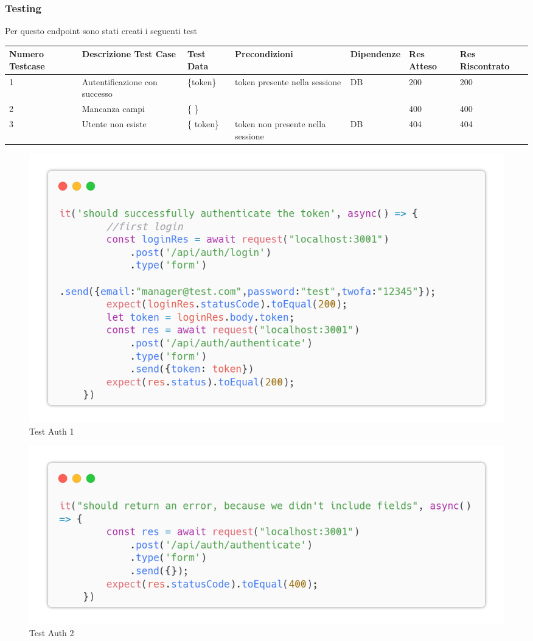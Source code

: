 \documentclass{report}
\begin{document}
\subsubsection*{Testing}
Per questo endpoint sono stati creati i seguenti test
\begin{center} %
	\centering
	\begin{tabular}{ |p{1cm}|p{2cm}|p{2cm}|p{2cm}|p{2cm}|p{1cm}|p{1cm}| }
		\hline
		Numero Testcase & Descrizione Test Case         & Test Data  & Precondizioni                     & Dipendenze & Res Atteso & Res Riscontrato \\
		\hline
		1               & Autentificazione con successo & \{token\}  & token presente nella sessione     & DB         & 200        & 200             \\
		\hline
		2               & Mancanza campi                & \{ \}      &                                   &            & 400        & 400             \\
		\hline
		3               & Utente non esiste             & \{ token\} & token non presente nella sessione & DB         & 404        & 404             \\
		\hline
	\end{tabular}
\end{center}
\begin{figure}[H]
	\centering\includegraphics[width=1\textwidth]{images/microservizio-autenticazione/tests/auth_test_1.png}
	\caption{Test Auth 1}
\end{figure}
\begin{figure}[H]
	\centering\includegraphics[width=1\textwidth]{images/microservizio-autenticazione/tests/auth_test_2.png}
	\caption{Test Auth 2}
\end{figure}
\end{document}
